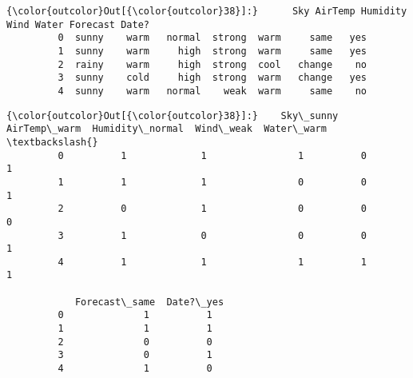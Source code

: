 \documentclass[11pt]{article}
\begin{document}
            \begin{Verbatim}[commandchars=\\\{\}]
{\color{outcolor}Out[{\color{outcolor}38}]:}      Sky AirTemp Humidity    Wind Water Forecast Date?
         0  sunny    warm   normal  strong  warm     same   yes
         1  sunny    warm     high  strong  warm     same   yes
         2  rainy    warm     high  strong  cool   change    no
         3  sunny    cold     high  strong  warm   change   yes
         4  sunny    warm   normal    weak  warm     same    no
\end{Verbatim}
        
            \begin{Verbatim}[commandchars=\\\{\}]
{\color{outcolor}Out[{\color{outcolor}38}]:}    Sky\_sunny  AirTemp\_warm  Humidity\_normal  Wind\_weak  Water\_warm  \textbackslash{}
         0          1             1                1          0           1   
         1          1             1                0          0           1   
         2          0             1                0          0           0   
         3          1             0                0          0           1   
         4          1             1                1          1           1   
         
            Forecast\_same  Date?\_yes  
         0              1          1  
         1              1          1  
         2              0          0  
         3              0          1  
         4              1          0  
\end{Verbatim}
        
\end{document}
